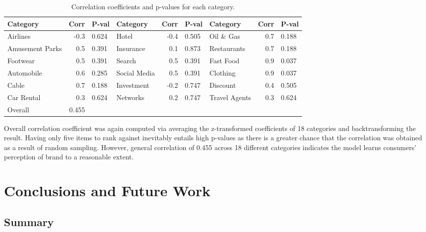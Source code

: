 \documentclass[a4paper,12pt,twoside,openright]{report}
\begin{document}
\begin{table}[h]
\vspace{0.2cm}
\footnotesize
\hspace{-0.8cm}
\begin{tabular}{lrl|lrl|lrl}
Category            & Corr & P-val & Category     & Corr & P-val & Category      & Corr & P-val \\ \hline
Airlines            & -0.3 & 0.624 & Hotel        & -0.4 & 0.505 & Oil \& Gas    & 0.7  & 0.188 \\
Amusement Parks     & 0.5  & 0.391 & Insurance    & 0.1  & 0.873 & Restaurants   & 0.7  & 0.188 \\
Footwear & 0.5  & 0.391 & Search       & 0.5  & 0.391 & Fast Food     & 0.9  & 0.037 \\
Automobile          & 0.6  & 0.285 & Social Media & 0.5  & 0.391 & Clothing      & 0.9  & 0.037 \\
Cable               & 0.7  & 0.188 & Investment   & -0.2 & 0.747 & Discount      & 0.4  & 0.505 \\
Car Rental          & 0.3  & 0.624 & Networks     & 0.2  & 0.747 & Travel Agents & 0.3  & 0.624 \\ \hline 
Overall             & 0.455     &       &              &      &       &               &      &      \\ \hline
\end{tabular}
\caption{Correlation coefficients and p-values for each category.}
\label{tab:chap5:brand_eval_corr}
\end{table}

Overall correlation coefficient was again computed via averaging the z-transformed coefficients of 18 categories and backtransforming the result. Having only five items to rank against inevitably entails high p-values as there is a greater chance that the correlation was obtained as a result of random sampling. However, general correlation of 0.455 across 18 different categories indicates the model learns consumers' perception of brand to a reasonable extent.



\chapter{Conclusions and Future Work} 
\label{ch6}

\section{Summary}
\end{document}
